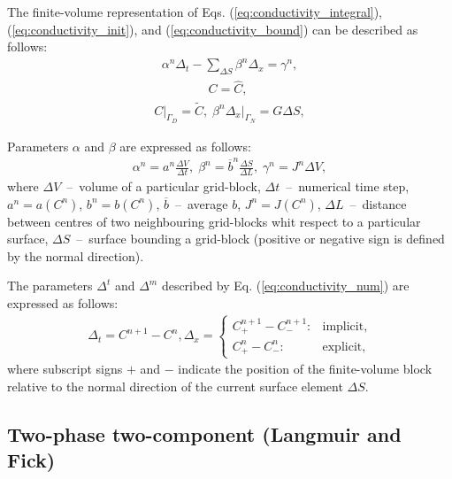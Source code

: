 \documentclass[a4paper,14pt,english]{extreport}
\begin{document}
The finite-volume representation of Eqs. (\ref{eq:conductivity_integral}), (\ref{eq:conductivity_init}), and (\ref{eq:conductivity_bound}) can be described as follows:
    \begin{eqnarray}
        \label{eq:conductivity_num}
        \alpha^n \Delta_{t} - \sum_{\Delta S} \beta^n\Delta_{x} = \gamma^n,
    \end{eqnarray}
    \begin{eqnarray}
         \label{eq:eq:conductivity_init_num}
        C = \hat{C}, \; 
    \end{eqnarray}
    \begin{eqnarray}
    \label{eq:eq:conductivity_bound_num}
      \label{eq:conductivity_bound_num}
    C \Big|_{\mathit{\Gamma}_D}= \tilde{C}, \; \beta^n\Delta_x \Big|_{\mathit{\Gamma}_N} = G\Delta S,
    \end{eqnarray}

Parameters $\alpha$ and $\beta$ are expressed as follows:
    \begin{eqnarray}
        \label{eq:alpha_beta}
        \alpha^n = a^n\frac{\Delta V}{\Delta t}, \;
        \beta^n = \overline{b}^n\frac{\Delta S}{\Delta L}, \; \gamma^n = J^n \Delta V,
    \end{eqnarray}
where $\Delta V$~--~volume of a particular grid-block, $\Delta t$~--~numerical time step, $a^n = a\left(C^n\right)$, $b^n = b\left(C^n\right)$, $\overline{b}$~--~average $b$, $J^n=J\left(C^n\right)$, $\Delta L$~--~distance between centres of two neighbouring grid-blocks whit respect to a particular surface, $\Delta S$~--~surface bounding a grid-block (positive or negative sign is defined by the normal direction).

The parameters $\Delta^{t}$ and $\Delta^{m}$ described by Eq. (\ref{eq:conductivity_num}) are expressed as follows:
    \begin{eqnarray}
    \label{eq:delta_num}
    \Delta_t = C^{n+1} - C^{n}, \Delta_x = \begin{cases}
    C_{+}^{n+\mathit1} - C_{-}^{n+\mathit1} : &\text{implicit},\\
        C_{+}^{n} - C_{-}^{n} : &\text{explicit},
    \end{cases}
    \end{eqnarray}
where subscript signs $+$ and $-$ indicate the position of the finite-volume block relative to the normal direction of the current surface element $\Delta S$.

\subsection*{Two-phase two-component (Langmuir and Fick)}
\end{document}
